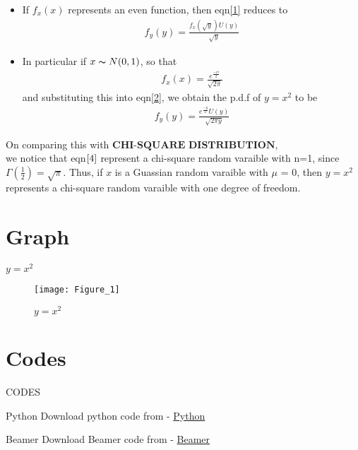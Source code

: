 \documentclass{beamer}
\begin{document}
\begin{frame}
    \begin{itemize}
        \item If $f_x(x)$ represents an even function, then eqn\eqref{1} reduces to 
        \begin{align} \label{2}
            f_y(y)= \frac{f_x(\sqrt{y})U(y)}{\sqrt{y}}
        \end{align}

        \item In particular if $x \thicksim N(0,1)$, so that 
        \begin{align} \label{3}
            f_x(x)=\frac{e^\frac{-x^2}{2}}{\sqrt{2\pi}}
        \end{align}
        and substituting this into eqn\eqref{2}, we obtain the p.d.f of $y = x^2 $ to be 
        \begin{align} \label{4}
            f_y(y)=\frac{e^\frac{-y}{2} U(y)}{\sqrt{2\pi y}}
        \end{align}
    \end{itemize}
\end{frame}

\begin{frame}
    On comparing this with $\textbf{CHI-SQUARE DISTRIBUTION}$,\\ we notice that eqn$\eqref{4}$ represent a chi-square random varaible with n=1, since $\varGamma(\frac{1}{2}) =  \sqrt{\pi}$. Thus, if $x$ is a Guassian random varaible with $\mu$ = 0, then $y=x^2$ represents a chi-square random varaible with one degree of freedom.
\end{frame}

\section{Graph}
\begin{frame}{$y = x^2$}
    \begin{figure}[!ht]
		\centering
		\texttt{[image: Figure\_1]}
		\caption{$y = x^2$}
		\label{fig1}
	\end{figure}
\end{frame}

\section{Codes}
\begin{frame}{CODES}
    \begin{block}{Python}
         Download python code from - \href{https://github.com/jarpula-Bhanu/Assignment_9/blob/main/code/graph.py}{Python}
    \end{block}

 \begin{block}{Beamer}
         Download Beamer code from - \href{}{Beamer}
    \end{block}
\end{frame} 
\end{document}
